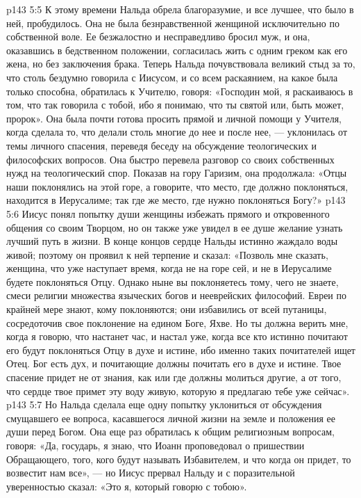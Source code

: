 \vs p143 5:5 К этому времени Нальда обрела благоразумие, и все лучшее, что было в ней, пробудилось. Она не была безнравственной женщиной исключительно по собственной воле. Ее безжалостно и несправедливо бросил муж, и она, оказавшись в бедственном положении, согласилась жить с одним греком как его жена, но без заключения брака. Теперь Нальда почувствовала великий стыд за то, что столь бездумно говорила с Иисусом, и со всем раскаянием, на какое была только способна, обратилась к Учителю, говоря: «Господин мой, я раскаиваюсь в том, что так говорила с тобой, ибо я понимаю, что ты святой или, быть может, пророк». Она была почти готова просить прямой и личной помощи у Учителя, когда сделала то, что делали столь многие до нее и после нее, --- уклонилась от темы личного спасения, переведя беседу на обсуждение теологических и философских вопросов. Она быстро перевела разговор со своих собственных нужд на теологический спор. Показав на гору Гаризим, она продолжала: «Отцы наши поклонялись на этой горе, а  говорите, что место, где должно поклоняться, находится в Иерусалиме; так где же место, где нужно поклоняться Богу?»
\vs p143 5:6 Иисус понял попытку души женщины избежать прямого и откровенного общения со своим Творцом, но он также уже увидел в ее душе желание узнать лучший путь в жизни. В конце концов сердце Нальды истинно жаждало воды живой; поэтому он проявил к ней терпение и сказал: «Позволь мне сказать, женщина, что уже наступает время, когда не на горе сей, и не в Иерусалиме будете поклоняться Отцу. Однако ныне вы поклоняетесь тому, чего не знаете, смеси религии множества языческих богов и нееврейских философий. Евреи по крайней мере знают, кому поклоняются; они избавились от всей путаницы, сосредоточив свое поклонение на едином Боге, Яхве. Но ты должна верить мне, когда я говорю, что настанет час, и настал уже, когда все кто истинно почитают его будут поклоняться Отцу в духе и истине, ибо именно таких почитателей ищет Отец. Бог есть дух, и почитающие должны почитать его в духе и истине. Твое спасение придет не от знания, как или где должны молиться другие, а от того, что сердце твое примет эту воду живую, которую я предлагаю тебе уже сейчас».
\vs p143 5:7 Но Нальда сделала еще одну попытку уклониться от обсуждения смущавшего ее вопроса, касавшегося личной жизни на земле и положения ее души перед Богом. Она еще раз обратилась к общим религиозным вопросам, говоря: «Да, государь, я знаю, что Иоанн проповедовал о пришествии Обращающего, того, кого будут называть Избавителем, и что когда он придет, то возвестит нам все», --- но Иисус прервал Нальду и с поразительной уверенностью сказал: «Это я, который говорю с тобою».
